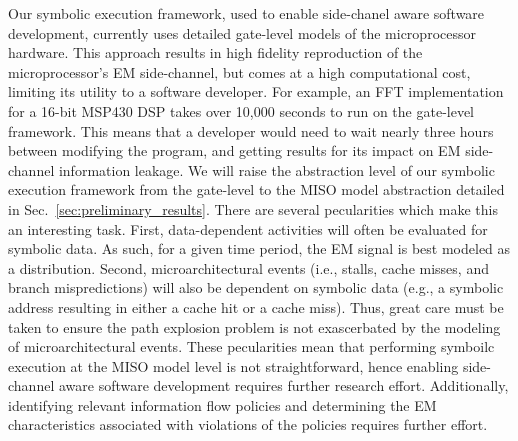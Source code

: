 \color{red}
Our symbolic execution framework, used to enable side-chanel aware software
development, currently uses detailed gate-level models of the microprocessor
hardware.  This approach results in high fidelity reproduction of the
microprocessor's EM side-channel, but comes at a high computational cost,
limiting its utility to a software developer.
For example, an FFT implementation for a 16-bit MSP430 DSP takes over 10,000
seconds to run on the gate-level framework.  This means that a developer would
need to wait nearly three hours between modifying the program, and getting
results for its impact on EM side-channel information leakage.  We will raise
the abstraction level of our symbolic execution framework from the gate-level
to the MISO model abstraction detailed in Sec.~\ref{sec:preliminary_results}.
There are several pecularities which make this an interesting task.  First,
data-dependent activities will often be evaluated for symbolic data.  As such,
for a given time period, the EM signal is best modeled as a distribution.
Second, microarchitectural events (i.e., stalls, cache misses, and branch
mispredictions) will also be dependent on symbolic data (e.g., a symbolic
address resulting in either a cache hit or a cache miss).  Thus, great care
must be taken to ensure the path explosion problem is not exascerbated by the
modeling of microarchitectural events.  These pecularities mean that performing
symboilc execution at the MISO model level is not straightforward,
hence enabling side-channel aware software development requires further
research effort.
Additionally, identifying relevant information flow policies and determining
the EM characteristics associated with violations of the policies requires
further effort.
\color{black}


